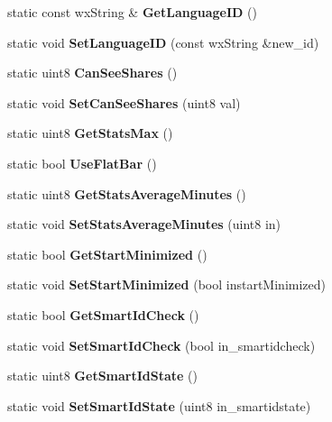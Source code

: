 \begin{DoxyCompactItemize}
\item 
static const wxString \& {\bfseries GetLanguageID} ()\label{classCPreferences_a8f98ebf8242c46d92f3d0d01512722d2}

\item 
static void {\bfseries SetLanguageID} (const wxString \&new\_\-id)\label{classCPreferences_a876096fa28d9bddaccbc53a458290e0c}

\item 
static uint8 {\bfseries CanSeeShares} ()\label{classCPreferences_a52abe2888c3dc11d048e847adf2c6c35}

\item 
static void {\bfseries SetCanSeeShares} (uint8 val)\label{classCPreferences_ad6b0ccc342c0bf3fe01db52acdf57773}

\item 
static uint8 {\bfseries GetStatsMax} ()\label{classCPreferences_acb362d0bb023cec9e9cae83f8f6f33f4}

\item 
static bool {\bfseries UseFlatBar} ()\label{classCPreferences_a5273c900d81074c77960984418dba5ba}

\item 
static uint8 {\bfseries GetStatsAverageMinutes} ()\label{classCPreferences_a4f124e32828fbbc2b884f44e3de51665}

\item 
static void {\bfseries SetStatsAverageMinutes} (uint8 in)\label{classCPreferences_acea2ba5bab086f7a5dd6bfab3d9a8f36}

\item 
static bool {\bfseries GetStartMinimized} ()\label{classCPreferences_ac6cd01538f2f51986391fd94cdb6a257}

\item 
static void {\bfseries SetStartMinimized} (bool instartMinimized)\label{classCPreferences_a01a370c7119a518bc9b7d9e0d775f3ea}

\item 
static bool {\bfseries GetSmartIdCheck} ()\label{classCPreferences_a14cb6ea482ee526ae2772b59feac275b}

\item 
static void {\bfseries SetSmartIdCheck} (bool in\_\-smartidcheck)\label{classCPreferences_a378d464bc05046b579c316e31a2f8e99}

\item 
static uint8 {\bfseries GetSmartIdState} ()\label{classCPreferences_a27b409b2fe5c07948c65c048bdf92acf}

\item 
static void {\bfseries SetSmartIdState} (uint8 in\_\-smartidstate)\label{classCPreferences_abcc0d48508097977537220fc10ec4466}


\end{DoxyCompactItemize}
